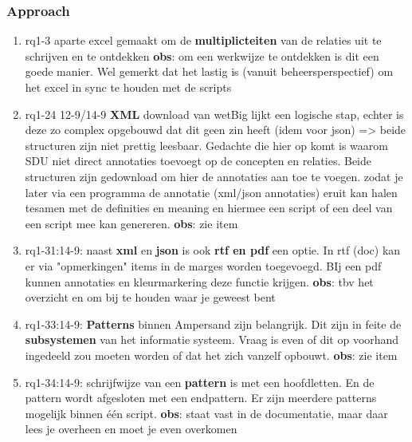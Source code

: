 \subsubsection{Approach}
\begin{comment}
plaats hier de afgehandelde items.
\end{comment}
\begin{enumerate}
    \item rq1-3 aparte excel gemaakt om de \textbf{multiplicteiten} van de relaties uit te schrijven en te ontdekken
    \newline\textbf{obs}: om een werkwijze te ontdekken is dit een goede manier. 
    Wel gemerkt dat het lastig is (vanuit beheersperspectief) om het excel in sync te houden met de scripts

    \item rq1-24 12-9/14-9 \textbf{XML} download van wetBig lijkt een logische stap, echter is deze zo complex opgebouwd dat dit geen zin heeft (idem voor json) => beide structuren zijn niet prettig leesbaar. Gedachte die hier op komt is waarom SDU niet direct annotaties toevoegt op de concepten en relaties. Beide structuren zijn gedownload om hier de annotaties aan toe te voegen. zodat je later via een programma de annotatie (xml/json annotaties) eruit kan halen tesamen met de definities en meaning en hiermee een script of een deel van een script mee kan genereren.
    \newline\textbf{obs}: zie item
    
    \item rq1-31:14-9: naast \textbf{xml} en \textbf{json} is ook \textbf{rtf en pdf} een optie. In rtf (doc) kan er via "opmerkingen" items in de marges worden toegevoegd. BIj een pdf kunnen annotaties en kleurmarkering deze functie krijgen.
    \newline\textbf{obs}: tbv het overzicht en om bij te houden waar je geweest bent
    
    \item rq1-33:14-9: \textbf{Patterns} binnen Ampersand zijn belangrijk. Dit zijn in feite de \textbf{subsystemen} van het informatie systeem. Vraag is even of dit op voorhand ingedeeld zou moeten worden of dat het zich vanzelf opbouwt.
    \newline\textbf{obs}: zie item
    
    \item rq1-34:14-9: schrijfwijze van een \textbf{pattern} is met een hoofdletten. En de pattern wordt afgesloten met een endpattern. Er zijn meerdere patterns mogelijk binnen één script.
    \newline\textbf{obs}: staat vast in de documentatie, maar daar lees je overheen en moet je even overkomen
    

\end{enumerate}
